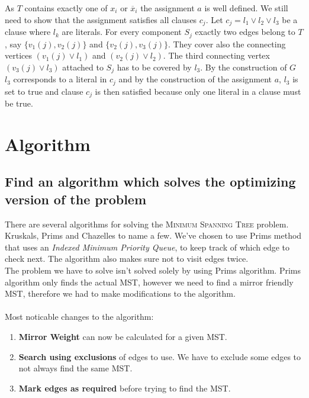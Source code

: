 \documentclass[12pt]{report}
\begin{document}
As $T$ contains exactly one of $x_i$ or $\overline{x}_i$ the assignment $a$ is well defined. We still need to show that the assignment satisfies all clauses $c_j$. Let $c_j = l_1 \vee l_2 \vee l_3$ be a clause where $l_k$ are literals. For every component $S_j$ exactly two edges belong to $T$, say $\{v_1(j),v_2(j)\}$ and $\{v_2(j),v_3(j)\}$. They cover also the connecting vertices $(v_1(j) \vee l_1)$ and $(v_2(j) \vee l_2)$. The third connecting vertex $(v_3(j) \vee l_3)$ attached to $S_j$ has to be covered by $l_3$. By the construction of $G$ $l_3$ corresponds to a literal in $c_j$ and by the construction of the assignment $a$, $l_3$ is set to true and clause $c_j$ is then satisfied because only one literal in a clause must be true.

\chapter{Algorithm}
\section{Find an algorithm which solves the optimizing version of the problem}
\label{sec:alg1}
There are several algorithms for solving the \textsc{Minimum Spanning Tree} problem.  Kruskals, Prims and Chazelles to name a few. We've chosen to use Prims method that uses an \emph{Indexed Minimum Priority Queue}, to keep track of which edge to check next. The algorithm also makes sure not to visit edges twice.\\
The problem we have to solve isn't solved solely by using Prims algorithm. Prims algorithm only finds the actual MST, however we need to find a mirror friendly MST, therefore we had to make modifications to the algorithm.\\
\\
Most noticable changes to the algorithm:
\begin{enumerate}
	\item[] \textbf{Mirror Weight} can now be calculated for a given MST.
	\item[] \textbf{Search using exclusions} of edges to use. We have to exclude some edges to not always find the same MST.
	\item[] \textbf{Mark edges as required} before trying to find the MST.
\end{enumerate}
\end{document}
